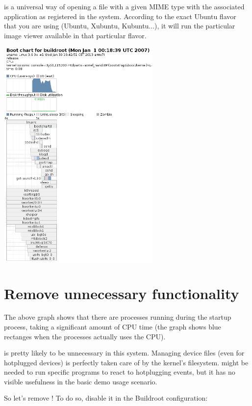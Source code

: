  is a universal way of opening a file with a given MIME
type with the associated application as registered in the system.
According to the exact Ubuntu flavor that you are using (Ubuntu,
Xubuntu, Kubuntu...), it will run the particular image viewer available in that
particular flavor.

\begin{center}
\includegraphics[width=8cm]{labs/boottime-init-scripts/bootlog.png}
\end{center}

\section{Remove unnecessary functionality}

The above graph shows that there are  processes running
during the startup process, taking a significant amount of CPU time
(the graph shows blue rectanges when the processes actually uses
the CPU).

 is pretty likely to be unnecessary in this system. Managing
device files (even for hotplugged devices) is perfectly taken care
of by the kernel's  filesystem.  might be
needed to run specific programs to react to hotplugging events, but
it has no visible usefulness in the basic demo usage scenario.

So let's remove ! To do so, disable it in the Buildroot
configuration:

